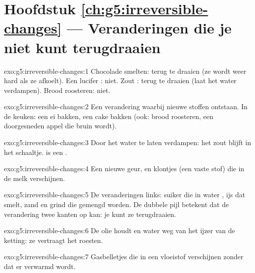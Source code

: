 \section*{Hoofdstuk \ref{ch:g5:irreversible-changes} --- Veranderingen die je niet kunt terugdraaien}

\begin{solution}{exo:g5:irreversible-changes:1}
Chocolade smelten: terug te draaien (ze wordt weer hard als ze afkoelt).
Een lucifer : niet. Zout : terug te draaien (laat het
water verdampen). Brood roosteren: niet.
\end{solution}

\begin{solution}{exo:g5:irreversible-changes:2}
Een verandering waarbij nieuwe stoffen ontstaan. In de keuken: een ei
bakken, een cake bakken (ook: brood roosteren, een doorgesneden appel die
bruin wordt).
\end{solution}

\begin{solution}{exo:g5:irreversible-changes:3}
Door het water te laten verdampen: het zout blijft in het schaaltje.
 is een .
\end{solution}

\begin{solution}{exo:g5:irreversible-changes:4}
Een nieuwe geur, en klontjes (een vaste stof) die in de melk verschijnen.
\end{solution}

\begin{solution}{exo:g5:irreversible-changes:5}
De veranderingen links: suiker die in water , ijs dat smelt, zand
en grind die gemengd worden. De dubbele pijl betekent dat de verandering
twee kanten op kan: je kunt ze terugdraaien.
\end{solution}

\begin{solution}{exo:g5:irreversible-changes:6}
De olie houdt  en water weg van het ijzer van de ketting: ze
vertraagt het roesten.
\end{solution}

\begin{solution}{exo:g5:irreversible-changes:7}
Gasbelletjes die in een vloeistof verschijnen zonder dat er verwarmd
wordt.
\end{solution}

